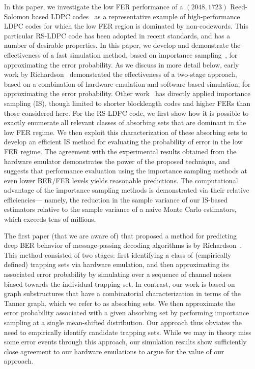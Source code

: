 In this paper, we investigate the low FER performance of a
$(2048,1723)$ Reed-Solomon based LDPC codes~\cite{rs-ldpc} as a
representative example of high-performance LDPC codes for which the
low FER region is dominated by non-codewords.  This particular RS-LDPC
code has been adopted in recent standards, and has a number of
desirable properties.  In this paper, we develop and demonstrate the
effectiveness of a fast simulation method, based on importance
sampling~\cite{Bucklew90}, for approximating the error probability.
As we discuss in more detail below, early work by
Richardson~\cite{richardson} demonstrated the effectiveness of a
two-stage approach, based on a combination of hardware emulation and
software-based simulation, for approximating the error probability.
Other work~\cite{ryan,ucla} has directly applied importance sampling
(IS), though limited to shorter blocklength codes and higher FERs than
those considered here.  For the RS-LDPC code, we first show how it is
possible to exactly enumerate all relevant classes of absorbing sets
that are dominant in the low FER regime.  We then exploit this
characterization of these absorbing sets to develop an efficient IS
method for evaluating the probability of error in the low FER regime.
The agreement with the experimental results obtained from the hardware
emulator demonstrates the power of the proposed technique, and
suggests that performance evaluation using the importance sampling
methods at even lower BER/FER levels yields reasonable
predictions. The computational advantage of the importance sampling
methods is demonstrated via their relative efficiencies--- namely, the
reduction in the sample variance of our IS-based estimators relative
to the sample variance of a naive Monte Carlo estimators, which
exceeds tens of millions.

The first paper (that we are aware of) that proposed a method for
predicting deep BER behavior of message-passing decoding algorithms is
by Richardson~\cite{richardson}.  This method consisted of two stages:
first identifying a class of (empirically defined) trapping sets via
hardware emulation, and then approximating its associated error
probability by simulating over a sequence of channel noises biased
towards the individual trapping set.  In contrast, our work is based
on graph substructures that have a combinatorial characterization in
terms of the Tanner graph, which we refer to as absorbing sets.  We
then approximate the error probability associated with a given
absorbing set by performing importance sampling at a single
mean-shifted distribution.  Our approach thus obviates the need to
empirically identify candidate trapping sets. While we may in theory
miss some error events through this approach, our simulation results
show sufficiently close agreement to our hardware emulations to argue
for the value of our approach.

